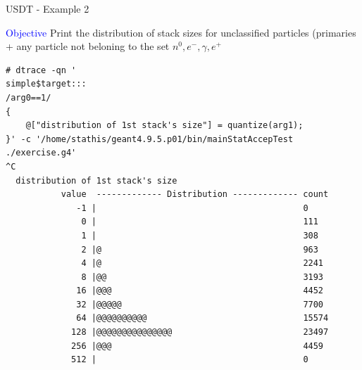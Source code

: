 \documentclass{beamer}
\begin{document}
\begin{frame}[fragile]{USDT - Example 2}
\lstset{basicstyle=\tiny\ttfamily}

\textcolor{blue}{Objective} Print the distribution of stack sizes for unclassified particles
(primaries + any particle not beloning to the set ${n^0, e^-,\gamma, e^+}$

\lstset{frame=single, columns=flexible}
\begin{lstlisting}
# dtrace -qn '
simple$target:::
/arg0==1/
{
    @["distribution of 1st stack's size"] = quantize(arg1);
}' -c '/home/stathis/geant4.9.5.p01/bin/mainStatAccepTest ./exercise.g4'
^C
  distribution of 1st stack's size
           value  ------------- Distribution ------------- count
              -1 |                                         0
               0 |                                         111
               1 |                                         308
               2 |@                                        963
               4 |@                                        2241
               8 |@@                                       3193
              16 |@@@                                      4452
              32 |@@@@@                                    7700
              64 |@@@@@@@@@@                               15574
             128 |@@@@@@@@@@@@@@@                          23497
             256 |@@@                                      4459
             512 |                                         0
\end{lstlisting}
\end{frame}
\end{document}
